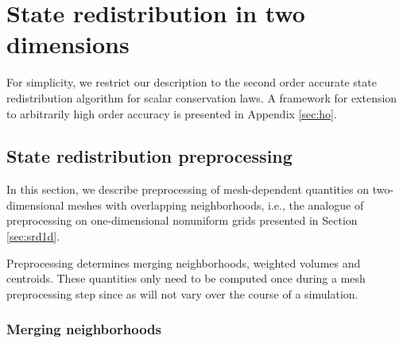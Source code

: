 \section{State redistribution in two dimensions}\label{sec:srdAlg}

For simplicity, we restrict our description to the second order accurate state redistribution algorithm for scalar conservation laws.  A framework for extension to arbitrarily high order accuracy is presented in Appendix \ref{sec:ho}.  

\subsection{State redistribution preprocessing}\label{sec:preprocessing}


In this section, we describe preprocessing of mesh-dependent quantities on two-dimensional meshes with overlapping neighborhoods, i.e., the analogue of preprocessing on one-dimensional nonuniform grids presented in Section \ref{sec:srd1d}.

Preprocessing determines merging neighborhoods, weighted volumes and centroids.  These quantities only need to be computed once during a mesh preprocessing step since as will not vary over the course of a simulation.  



\subsubsection*{Merging neighborhoods}

